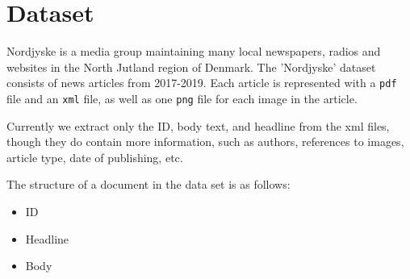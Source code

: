\section{Dataset}
Nordjyske is a media group maintaining many local newspapers, radios and websites in the North Jutland region of Denmark.
The 'Nordjyske' dataset consists of news articles from 2017-2019. 
Each article is represented with a \texttt{pdf} file and an \texttt{xml} file, as well as one \texttt{png} file for each image in the article.

Currently we extract only the ID, body text, and headline from the xml files, though they do contain more information, such as authors, references to images, article type, date of publishing, etc.

The structure of a document in the data set is as follows:
\begin{itemize}
	\item ID
	\item Headline
	\item Body
\end{itemize}
